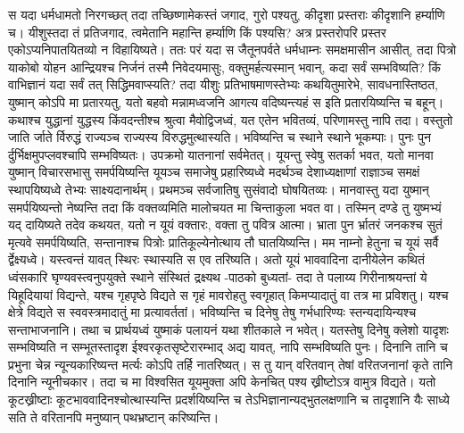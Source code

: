\adhyAya
{}
\vakya स यदा धर्मधामतो निरगच्छत् तदा तच्छिष्णामेकस्तं जगाद, गुरो पश्यतु, कीदृशा प्रस्तराः कीदृशानि हर्म्याणि च।
\vakya यीशुस्तदा तं प्रतिजगाद, त्वमेतानि महान्ति हर्म्याणि किं पश्यसि? अत्र प्रस्तरोपरि प्रस्तर एकोऽप्यनिपातयितव्यो न विहायिष्यते।
\vakya ततः परं यदा स जैतूनपर्वते धर्मधाम्नः समक्षमासीन आसीत्, तदा पित्रो याकोबो योहन आन्द्रियश्च निर्जनं तस्मै निवेदयमासुः,
\vakya वक्तुमर्हत्यस्मान् भवान्, कदा सर्वं सम्भविष्यति? किं वाभिज्ञानं यदा सर्वं तत् सिद्धिमवाप्स्यति?
\vakya तदा यीशुः प्रतिभाषमाणस्तेभ्यः कथयितुमारेभे, सावधनास्तिष्ठत, युष्मान् कोऽपि मा प्रतारयतु,
\vakya यतो बहवो मन्नामध्वजनि आगत्य वदिष्यन्त्यहं स इति प्रतारयिष्यन्ति च बहून्।
\vakya कथाश्च युद्धानां युद्धस्य किंवदन्तीश्च श्रुत्वा मैवोद्विजध्वं, यत एतेन भवितव्यं, परिणामस्तु नापि तदा।
\vakya वस्तुतो जाति र्जाते र्विरुद्धं राज्यञ्च राज्यस्य विरुद्धमुत्थास्यति। भविष्यन्ति च स्थाने स्थाने भूकम्पाः। पुनः पुन र्दुर्भिक्षमुपप्लवश्चापि सम्भविष्यतः। उपक्रमो यातनानां सर्वमेतत्।
\vakya यूयन्तु स्वेषु सतर्का भवत, यतो मानवा युष्मान् विचारसभासु समर्पयिष्यन्ति यूयञ्च समाजेषु प्रहारिष्यध्वे मदर्थञ्च देशाध्यक्षाणां राज्ञाञ्च समक्षं स्थापयिष्यध्वे तेभ्यः साक्ष्यदानार्थम्।
\vakya प्रथमञ्च सर्वजातिषु सुसंवादो घोषयितव्यः।
\vakya मानवास्तु यदा युष्मान् समर्पयिष्यन्तो नेष्यन्ति तदा किं वक्तव्यमिति मालोचयत मा चिन्ताकुला भवत वा। तस्मिन् दण्डे तु युष्मभ्यं यद् दायिष्यते तदेव कथयत, यतो न यूयं वक्तारः, वक्ता तु पवित्र आत्मा।
\vakya भ्राता पुन र्भ्रातरं जनकश्च सुतं मृत्यवे समर्पयिष्यति, सन्तानाश्च पित्रोः प्रातिकूल्येनोत्थाय तौ घातयिष्यन्ति। मम नाम्नो हेतुना च यूयं सर्वै र्द्वेक्ष्यध्वे।
\vakya यस्त्वन्तं यावत् स्थिरः स्थास्यति स एव तरिष्यति।
\vakya अतो यूयं भाववादिना दानीयेलेन कथितं ध्वंसकारि घृण्यवस्त्वनुपयुक्ते स्थाने संस्थितं द्रक्ष्यथ -पाठको बुध्यतां- तदा ते पलाय्य गिरीनाश्रयन्तां ये यिहूदियायां विद्यन्ते,
\vakya यश्च गृहपृष्ठे विद्यते स गृहं मावरोहतु स्वगृहात् किमप्यादातुं वा तत्र मा प्रविशतु।
\vakya यश्च क्षेत्रे विद्यते स स्ववस्त्रमादातुं मा प्रत्यावर्ततां। भविष्यन्ति च दिनेषु तेषु गर्भधारिण्यः स्तन्यदायिन्यश्च सन्ताभाजनानि।
\vakya तथा च प्रार्थयध्वं युष्माकं पलायनं यथा शीतकाले न भवेत्।
\vakya यतस्तेषु दिनेषु क्लेशो यादृशः सम्भविष्यति न सम्भूतस्तादृश ईश्वरकृतसृष्टेरारम्भाद् अद्य यावत्, नापि सम्भविष्यति पुनः।
\vakya दिनानि तानि च प्रभुना चेन्न न्यून्यकारिष्यन्त मर्त्यः कोऽपि तर्हि नातरिष्यत्।
\vakya स तु यान् वरितवान् तेषां वरितजनानां कृते तानि दिनानि न्यूनीचकार।
\vakya तदा च मा विश्वसित यूयमुक्ता अपि केनचित् पश्य ख्रीष्टोऽत्र वामुत्र विद्यते।
\vakya यतो कूटख्रीष्टाः कूटभाववादिनश्चोत्थास्यन्ति प्रदर्शयिष्यन्ति च तेऽभिज्ञानान्यद्भुतलक्षणानि च तादृशानि यैः साध्ये सति ते वरितानपि मनुष्यान् पथभ्रष्टान् करिष्यन्ति।
